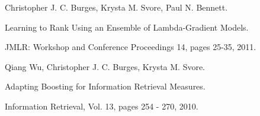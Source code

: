 \documentclass[14pt]{extarticle}
\begin{document}
\begin{thebibliography}{00}
	
	Christopher J. C. Burges, Krysta M. Svore, Paul N. Bennett.
		
	Learning to Rank Using an Ensemble of Lambda-Gradient Models.
	
	JMLR: Workshop and Conference Proceedings 14, pages 25-35, 2011.
		
	
	Qiang Wu, Christopher J. C. Burges, Krysta M. Svore.
	
	Adapting Boosting for Information Retrieval Measures.
	
	Information Retrieval, Vol. 13, pages 254 - 270,  2010.
	
\end{thebibliography}
\end{document}
